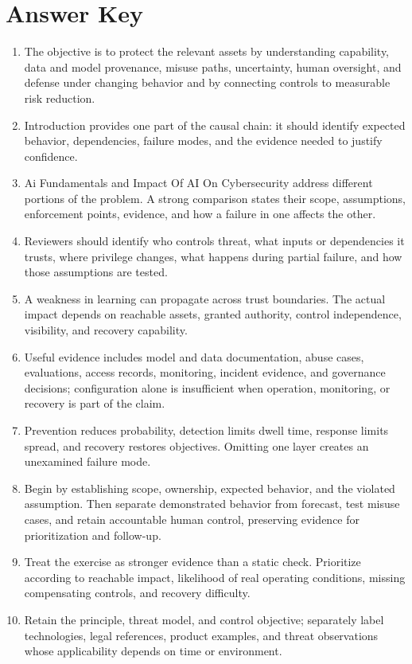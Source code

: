 \documentclass[11pt]{article}
\begin{document}
\section*{Answer Key}
\begin{enumerate}
\item The objective is to protect the relevant assets by understanding capability, data and model provenance, misuse paths, uncertainty, human oversight, and defense under changing behavior and by connecting controls to measurable risk reduction.
\item Introduction provides one part of the causal chain: it should identify expected behavior, dependencies, failure modes, and the evidence needed to justify confidence.
\item Ai Fundamentals and Impact Of AI On Cybersecurity address different portions of the problem. A strong comparison states their scope, assumptions, enforcement points, evidence, and how a failure in one affects the other.
\item Reviewers should identify who controls threat, what inputs or dependencies it trusts, where privilege changes, what happens during partial failure, and how those assumptions are tested.
\item A weakness in learning can propagate across trust boundaries. The actual impact depends on reachable assets, granted authority, control independence, visibility, and recovery capability.
\item Useful evidence includes model and data documentation, abuse cases, evaluations, access records, monitoring, incident evidence, and governance decisions; configuration alone is insufficient when operation, monitoring, or recovery is part of the claim.
\item Prevention reduces probability, detection limits dwell time, response limits spread, and recovery restores objectives. Omitting one layer creates an unexamined failure mode.
\item Begin by establishing scope, ownership, expected behavior, and the violated assumption. Then separate demonstrated behavior from forecast, test misuse cases, and retain accountable human control, preserving evidence for prioritization and follow-up.
\item Treat the exercise as stronger evidence than a static check. Prioritize according to reachable impact, likelihood of real operating conditions, missing compensating controls, and recovery difficulty.
\item Retain the principle, threat model, and control objective; separately label technologies, legal references, product examples, and threat observations whose applicability depends on time or environment.
\end{enumerate}
\end{document}
